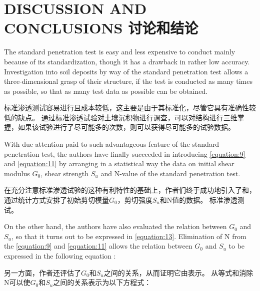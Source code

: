 \section*{DISCUSSION AND CONCLUSIONS 讨论和结论}

\begin{paracol}{2}
    
    The standard penetration test is easy and less expensive to conduct mainly because of its standardization, though it has a drawback in rather low accuracy. Investigation into soil deposits by way of the standard penetration test allows a three-dimensional grasp of their structure, if the test is conducted as many times as possible, so that as many test data as possible can be obtained.

    \switchcolumn

    标准渗透测试容易进行且成本较低，这主要是由于其标准化，尽管它具有准确性较低的缺点。 通过标准渗透试验对土壤沉积物进行调查，可以对结构进行三维掌握，如果该试验进行了尽可能多的次数，则可以获得尽可能多的试验数据。  
    
    \switchcolumn*

    With due attention paid to such advantageous feature of the standard penetration test, the authors have finally succeeded in introducing \autoref{equation:9} and \autoref{equation:11} by arranging in a statistical way the data on initial shear modulus $G_0$, shear strength $S_u$ and N-value of the standard penetration test.
    
    \switchcolumn
       
    在充分注意标准渗透试验的这种有利特性的基础上，作者们终于成功地引入了和，通过统计方式安排了初始剪切模量$G_0$，剪切强度$S_u$和N值的数据。 标准渗透测试。      
    \switchcolumn*

    On the other hand, the authors have also evaluated the relation between $G_0$ and $S_u$, so that it turns out to be expressed in \autoref{equation:13}. Elimination of N from the \autoref{equation:9} and \autoref{equation:11} allows the relation between $G_0$ and $S_u$ to be expressed in the following equation :

    \switchcolumn
       
    另一方面，作者还评估了$G_0$和$S_u$之间的关系，从而证明它由表示。 从等式和消除N可以使$G_0$和$S_u$之间的关系表示为以下方程式： 

\end{paracol}

